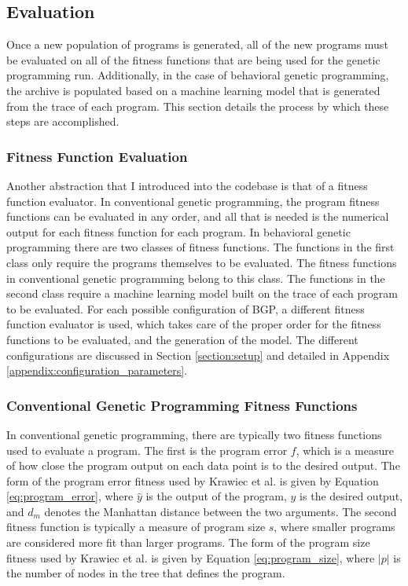 \subsection{Evaluation}
\label{section:evaluation}
Once a new population of programs is generated, all of the new programs must be evaluated on all of the fitness functions that are being used for the genetic programming run.  Additionally, in the case of behavioral genetic programming, the archive is populated based on a machine learning model that is generated from the trace of each program.  This section details the process by which these steps are accomplished.

\subsubsection{Fitness Function Evaluation}
Another abstraction that I introduced into the codebase is that of a fitness function evaluator.  In conventional genetic programming, the program fitness functions can be evaluated in any order, and all that is needed is the numerical output for each fitness function for each program.  In behavioral genetic programming there are two classes of fitness functions.  The functions in the first class only require the programs themselves to be evaluated.  The fitness functions in conventional genetic programming belong to this class.  The functions in the second class require a machine learning model built on the trace of each program to be evaluated.  For each possible configuration of BGP, a different fitness function evaluator is used, which takes care of the proper order for the fitness functions to be evaluated, and the generation of the model.  The different configurations are discussed in Section \ref{section:setup} and detailed in Appendix \ref{appendix:configuration_parameters}.

\subsubsection{Conventional Genetic Programming Fitness Functions}
\label{section:conventional_fitness_functions}
In conventional genetic programming, there are typically two fitness functions used to evaluate a program.  The first is the program error $f$, which is a measure of how close the program output on each data point is to the desired output.  The form of the program error fitness used by Krawiec et al. is given by Equation \ref{eq:program_error}, where $\hat y$ is the output of the program, $y$ is the desired output, and $d_{m}$ denotes the Manhattan distance between the two arguments.  The second fitness function is typically a measure of program size $s$, where smaller programs are considered more fit than larger programs.  The form of the program size fitness used by Krawiec et al. is given by Equation \ref{eq:program_size}, where $|p|$ is the number of nodes in the tree that defines the program.

